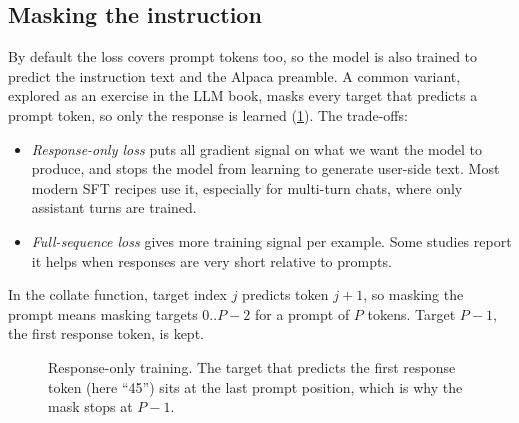 \subsection{Masking the instruction}\label{sec:instruct:maskprompt}

By default the loss covers prompt tokens too, so the model is also trained to predict
the instruction text and the Alpaca preamble. A common variant, explored as an exercise
in the LLM book, masks every target that predicts a prompt token, so only the response
is learned (\cref{fig:instruct:maskprompt}). The trade-offs:
\begin{itemize}
\item \emph{Response-only loss} puts all gradient signal on what we want the model to
produce, and stops the model from learning to generate user-side text. Most modern
SFT recipes use it, especially for multi-turn chats, where only assistant turns are
trained.
\item \emph{Full-sequence loss} gives more training signal per example. Some studies
report it helps when responses are very short relative to prompts.
\end{itemize}
In the collate function, target index $j$ predicts token $j+1$, so masking the prompt
means masking targets $0..P-2$ for a prompt of $P$ tokens. Target $P-1$, the first
response token, is kept.

\begin{figure}[ht]
\centering
{}
\caption{Response-only training. The target that predicts the first response token
(here ``45'') sits at the last prompt position, which is why the mask stops at $P-1$.}
\label{fig:instruct:maskprompt}
\end{figure}

